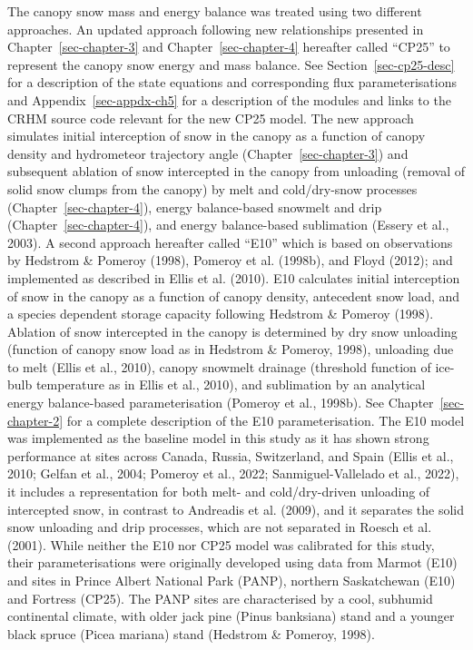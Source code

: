 \documentclass[
  letterpaper,
]{tex/uofsthesis-cs}
\begin{document}
The canopy snow mass and energy balance was treated using two different
approaches. An updated approach following new relationships presented in
Chapter~\ref{sec-chapter-3} and Chapter~\ref{sec-chapter-4} hereafter
called ``CP25'' to represent the canopy snow energy and mass balance.
See Section~\ref{sec-cp25-desc} for a description of the state equations
and corresponding flux parameterisations and
Appendix~\ref{sec-appdx-ch5} for a description of the modules and links
to the CRHM source code relevant for the new CP25 model. The new
approach simulates initial interception of snow in the canopy as a
function of canopy density and hydrometeor trajectory angle
(Chapter~\ref{sec-chapter-3}) and subsequent ablation of snow
intercepted in the canopy from unloading (removal of solid snow clumps
from the canopy) by melt and cold/dry-snow processes
(Chapter~\ref{sec-chapter-4}), energy balance-based snowmelt and drip
(Chapter~\ref{sec-chapter-4}), and energy balance-based sublimation
(Essery et al., 2003). A second approach hereafter called ``E10'' which
is based on observations by Hedstrom \& Pomeroy (1998), Pomeroy et al.
(1998b), and Floyd (2012); and implemented as described in Ellis et al.
(2010). E10 calculates initial interception of snow in the canopy as a
function of canopy density, antecedent snow load, and a species
dependent storage capacity following Hedstrom \& Pomeroy (1998).
Ablation of snow intercepted in the canopy is determined by dry snow
unloading (function of canopy snow load as in Hedstrom \& Pomeroy,
1998), unloading due to melt (Ellis et al., 2010), canopy snowmelt
drainage (threshold function of ice-bulb temperature as in Ellis et al.,
2010), and sublimation by an analytical energy balance-based
parameterisation (Pomeroy et al., 1998b). See
Chapter~\ref{sec-chapter-2} for a complete description of the E10
parameterisation. The E10 model was implemented as the baseline model in
this study as it has shown strong performance at sites across Canada,
Russia, Switzerland, and Spain (Ellis et al., 2010; Gelfan et al., 2004;
Pomeroy et al., 2022; Sanmiguel-Vallelado et al., 2022), it includes a
representation for both melt- and cold/dry-driven unloading of
intercepted snow, in contrast to Andreadis et al. (2009), and it
separates the solid snow unloading and drip processes, which are not
separated in Roesch et al. (2001). While neither the E10 nor CP25 model
was calibrated for this study, their parameterisations were originally
developed using data from Marmot (E10) and sites in Prince Albert
National Park (PANP), northern Saskatchewan (E10) and Fortress (CP25).
The PANP sites are characterised by a cool, subhumid continental
climate, with older jack pine (Pinus banksiana) stand and a younger
black spruce (Picea mariana) stand (Hedstrom \& Pomeroy, 1998).
\end{document}
